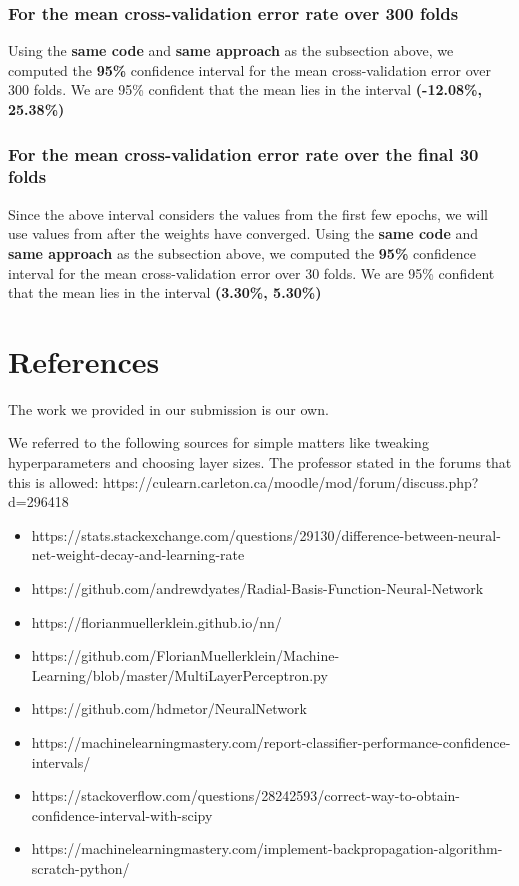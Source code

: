 \documentclass[11pt]{article}
\providecommand{\tightlist}{%
      \setlength{\itemsep}{0pt}\setlength{\parskip}{0pt}}
\begin{document}
\subsubsection{For the mean cross-validation error rate over 300
folds}\label{for-the-mean-cross-validation-error-rate-over-300-folds}

Using the \textbf{same code} and \textbf{same approach} as the
subsection above, we computed the \textbf{95\%} confidence interval for
the mean cross-validation error over 300 folds. We are 95\% confident
that the mean lies in the interval \textbf{(-12.08\%, 25.38\%)}

\subsubsection{For the mean cross-validation error rate over the final 30
folds}\label{for-the-mean-cross-validation-error-rate-over-the-final-30-folds}

Since the above interval considers the values from the first few epochs,
we will use values from after the weights have converged. Using the
\textbf{same code} and \textbf{same approach} as the subsection above,
we computed the \textbf{95\%} confidence interval for the mean
cross-validation error over 30 folds. We are 95\% confident that the
mean lies in the interval \textbf{(3.30\%, 5.30\%)}



\section{References}\label{references}

The work we provided in our submission is our own.

We referred to the following sources for simple matters like tweaking
hyperparameters and choosing layer sizes. The professor stated in the
forums that this is allowed:
https://culearn.carleton.ca/moodle/mod/forum/discuss.php?d=296418

\begin{itemize}
\tightlist
\item
  https://stats.stackexchange.com/questions/29130/difference-between-neural-net-weight-decay-and-learning-rate
\item
  https://github.com/andrewdyates/Radial-Basis-Function-Neural-Network
\item
  https://florianmuellerklein.github.io/nn/
\item
  https://github.com/FlorianMuellerklein/Machine-Learning/blob/master/MultiLayerPerceptron.py
\item
  https://github.com/hdmetor/NeuralNetwork
\item
  https://machinelearningmastery.com/report-classifier-performance-confidence-intervals/
\item
  https://stackoverflow.com/questions/28242593/correct-way-to-obtain-confidence-interval-with-scipy
\item
  https://machinelearningmastery.com/implement-backpropagation-algorithm-scratch-python/
\end{itemize}


    
    
    
    
\end{document}
